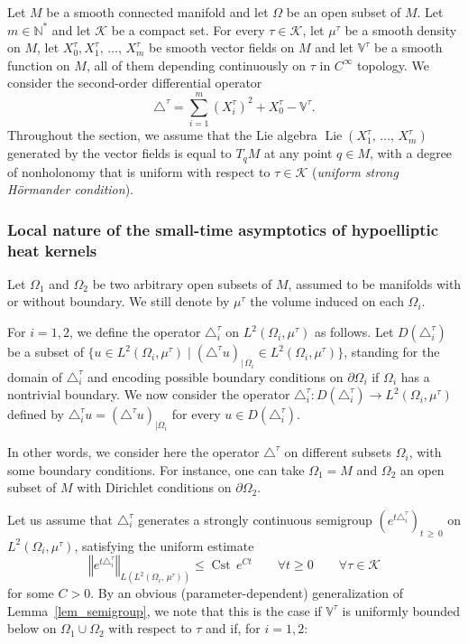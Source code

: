 \documentclass[AHL,Unicode,published]{cedram}
\newcommand*\N{\mathbb{N}}
\newcommand{\bbV}{\mathbb{V}}
\newcommand{\calK}{\mathcal{K}}
\DeclareMathOperator{\Cst}{Cst}
\DeclareMathOperator{\Lie}{Lie}
\renewcommand{\geq}{\geqslant}
\renewcommand{\leq}{\leqslant}
\let\oldforall\forall
\renewcommand*{\forall}{\mathrel{\oldforall}}
\begin{document}
Let $M$ be a smooth connected manifold and let $\Omega$ be an open subset of $M$. Let $m\in\N^*$ and let $\calK$ be a compact set. For every $\tau\in\calK$, let $\mu^\tau$ be a smooth density on $M$, let $X_0^\tau,X_1^\tau,\,\ldots,\,X_m^\tau$ be smooth vector fields on $M$ and let $\bbV^\tau$ be a smooth function on $M$, all of them depending continuously on $\tau$ in $C^\infty$ topology. We consider the second-order differential operator
\begin{equation*}
\triangle^\tau = \sum_{i=1}^m (X_i^\tau)^2 + X_0^\tau - \bbV^\tau.
\end{equation*}
Throughout the section, we assume that the Lie algebra $\Lie(X_1^\tau,\,\ldots,\,X_m^\tau)$ generated by the vector fields is equal to $T_qM$ at any point $q\in M$, with a degree of nonholonomy that is uniform with respect to $\tau\in\calK$ (\emph{uniform strong H\"ormander condition}).


\subsubsection{Local nature of the small-time asymptotics of hypoelliptic heat kernels}\label{sec_localheat}
Let $\Omega_1$ and $\Omega_2$ be two arbitrary open subsets of $M$, assumed to be manifolds with or without boundary. We still denote by $\mu^\tau$ the volume induced on each $\Omega_i$.

For $i=1,2$, we define the operator $\triangle^\tau_i$ on $L^2(\Omega_i,\mu^\tau)$ as follows. Let $D(\triangle^\tau_i)$ be a subset of $\{ u\in L^2(\Omega_i,\mu^\tau) \mid (\triangle^\tau u)_{\vert\,\Omega_i} \in L^2(\Omega_i,\mu^\tau) \}$, standing for the domain of $\triangle^\tau_i$ and encoding possible boundary conditions on $\partial \Omega_i$ if $\Omega_i$ has a nontrivial boundary. We now consider the operator $\triangle^\tau_i:D(\triangle^\tau_i)\rightarrow L^2(\Omega_i,\mu^\tau)$ defined by $\triangle^\tau_i u=(\triangle^\tau u)_{\vert \Omega_i}$ for every $u\in D(\triangle^\tau_i)$.

In other words, we consider here the operator $\triangle^\tau$ on different subsets $\Omega_i$, with some boundary conditions. For instance, one can take $\Omega_1=M$ and $\Omega_2$ an open subset of $M$ with Dirichlet conditions on $\partial \Omega_2$.

Let us assume that $\triangle^\tau_i$ generates a strongly continuous semigroup $(e^{t\triangle^\tau_i})_{t\,\geq\,0}$ on $L^2(\Omega_i,\mu^\tau)$, satisfying the uniform estimate
\[
\left\Vert e^{t\triangle^\tau_i} \right\Vert_{L\left(L^2(\Omega_i,\,\mu^\tau)\right)} \leq \Cst\, e^{C t}\qquad \forall t\geq 0\qquad \forall \tau\in\calK
\]
for some $C>0$. By an obvious (parameter-dependent) generalization of Lemma~\ref{lem_semigroup}, we note that this is the case if $\bbV^\tau$ is uniformly bounded below on $\Omega_1\cup \Omega_2$ with respect to $\tau$ and if, for $i=1,2$:
\goodbreak
\end{document}
